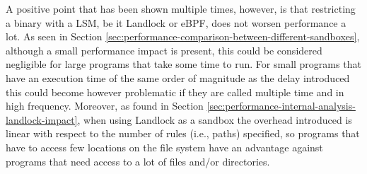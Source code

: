 A positive point that has been shown multiple times, however, is that restricting a binary
with a LSM, be it Landlock or eBPF, does not worsen performance a lot.
As seen in Section \ref{sec:performance-comparison-between-different-sandboxes}, although a small
performance impact is present, this could be considered negligible for large programs that take
some time to run. For small programs that have an execution time of the same order of magnitude
as the delay introduced this could become however problematic if they are called multiple time
and in high frequency.
Moreover, as found in Section \ref{sec:performance-internal-analysis-landlock-impact}, when using Landlock
as a sandbox the overhead introduced is linear with respect to the number of rules (i.e., paths) specified,
so programs that have to access few locations on the file system have an advantage against programs that need
access to a lot of files and/or directories.